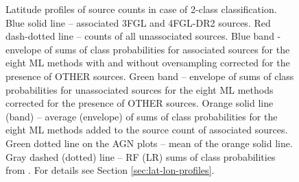 \begin{figure}[h]
\caption{Latitude profiles of source counts in case of 2-class classification. 
Blue solid line -- associated 3FGL and 4FGL-DR2  sources. 
Red dash-dotted line -- counts of all unassociated sources. 
Blue band - envelope of sums of class probabilities for associated sources for the eight ML methods with and without oversampling
corrected for the presence of OTHER sources.
Green band -- envelope of sums of class probabilities for unassociated sources for the eight ML methods corrected for the presence of OTHER sources. 
Orange solid line (band) -- average (envelope) of sums of class probabilities for the eight ML methods added to the source count of associated sources. 
Green dotted line on the AGN plots -- mean of the orange solid line.
Gray dashed (dotted) line -- RF (LR) sums of class probabilities from \cite{2016ApJ...820....8S}.
For details see Section \ref{sec:lat-lon-profiles}. }  
\label{fig:lat_profile}
\end{figure}

